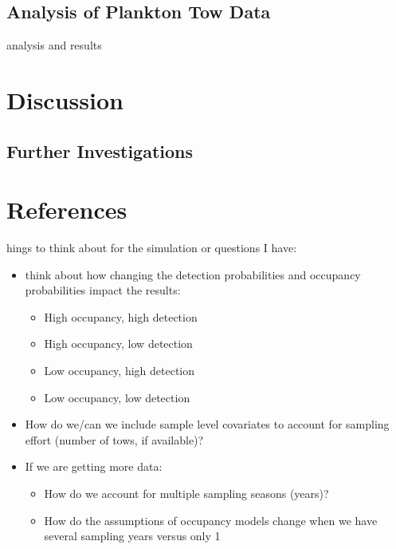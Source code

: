 \documentclass[12pt]{article}\usepackage[]{graphicx}\usepackage[]{color}
\begin{document}
\subsection{Analysis of Plankton Tow Data}

analysis and results 

\section{Discussion}

\subsection{Further Investigations}

\newpage
\section{References}
\begingroup
\renewcommand{\section}[2]{}%
\begin{flushleft}

%
%
%
%

\end{flushleft}
\endgroup

\newpage
\section{Appendix - R Code}

Things to think about for the simulation or questions I have: 
\begin{itemize}
\item think about how changing the detection probabilities and occupancy probabilities impact the results: 
	\begin{itemize}
	\item High occupancy, high detection
	\item High occupancy, low detection 
	\item Low occupancy, high detection 
	\item Low occupancy, low detection 
	\end{itemize}
\item How do we/can we include sample level covariates to account for sampling effort (number of tows, if available)?
\item If we are getting more data:
	\begin{itemize}
	\item How do we account for multiple sampling seasons (years)? 
	\item How do the assumptions of occupancy models change when we have several sampling years versus only 1
\end{itemize}
\end{itemize}
\end{document}
